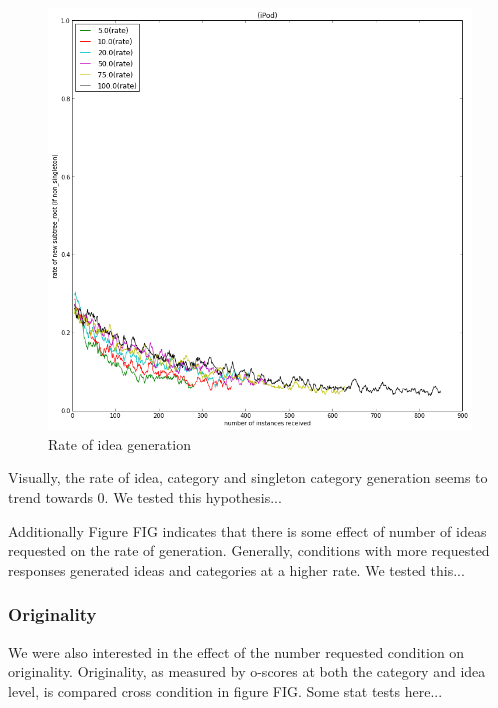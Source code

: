 \begin{figure}
    \includegraphics[width=0.9\columnwidth]{rate_new_ns_category_over_time}
    \caption{Rate of idea generation}
\end{figure}

Visually, the rate of idea, category and singleton category generation seems to trend towards 0. We tested this hypothesis...

Additionally Figure FIG indicates that there is some effect of number of ideas requested on the rate of generation. Generally, conditions with more requested responses generated ideas and categories at a higher rate. We tested this...

\subsubsection{Originality}

We were also interested in the effect of the number requested condition on originality. Originality, as measured by o-scores at both the category and idea level, is compared cross condition in figure FIG. Some stat tests here...

